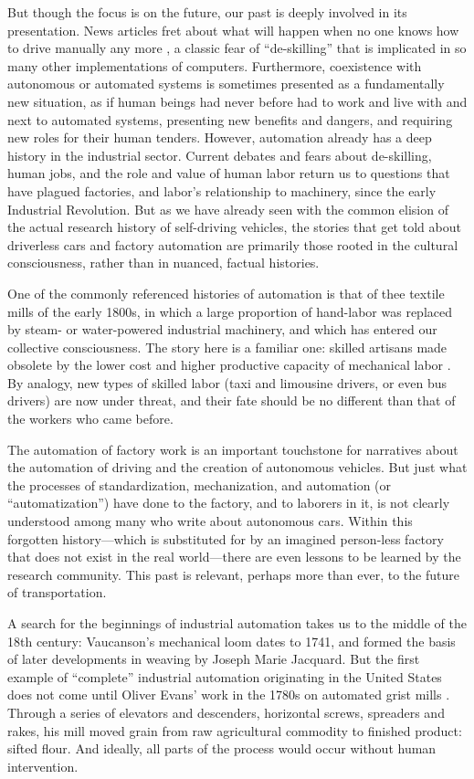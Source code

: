 But though the focus is on the future, our past is deeply involved
in its presentation. News articles fret
about what will happen when no one knows how to drive manually any
more \cite{pross}, a classic fear of ``de-skilling'' that is implicated in so many
other implementations of computers. Furthermore, coexistence with
autonomous or automated systems is sometimes presented as a fundamentally new
situation, as if human beings had never before had to work and live
with and next to automated systems, presenting new benefits and
dangers, and requiring new roles for their human tenders. However,
automation already has a deep 
history in the industrial sector. Current debates and fears about de-skilling, human jobs,
and the role and value of human labor return us to questions that have
plagued factories, and labor's relationship to machinery, since the
early Industrial Revolution. But as we have already seen with the common
elision of the actual research history of self-driving vehicles, the
stories that get told about driverless cars and factory automation are
primarily those rooted in the cultural consciousness, rather than in
nuanced, factual histories.

One of the commonly referenced histories of automation is that of thee
textile mills of the early 1800s, in which a large
proportion of hand-labor was replaced by steam- or
water-powered industrial machinery, and which has entered our collective
consciousness. The
story here is a familiar one: skilled artisans made obsolete by the
lower cost and higher productive capacity of mechanical labor \cite{pewPositive}. By
analogy, new types of skilled labor (taxi and limousine drivers, or
even bus drivers) are now under threat, and their fate should be no
different than that of the workers who came before.

The automation of factory work is an
important touchstone for narratives about the automation of driving
and the creation of autonomous vehicles. But just what the
processes of standardization, mechanization, and automation (or
``automatization'') have done to the factory, and to laborers in it, is
not clearly understood among many who write about autonomous cars. Within this
forgotten history---which is substituted for by an imagined person-less
factory that does not exist in the real world---there are even lessons to be
learned by the research community. This past is relevant, perhaps
more than ever, to the future of transportation.

A search for the beginnings of industrial automation takes us to the middle of
the 18th century: Vaucanson's mechanical loom dates to 1741, and formed the basis of
 later developments in weaving by Joseph Marie Jacquard.\cite[p. 9]{dieboldImpact} 
But the first example of ``complete'' industrial automation originating in the
United States does not come until Oliver Evans' work in the 1780s on
automated grist mills \cite[p. 5]{roesmithYankee}. Through a series of elevators and descenders,
horizontal screws, spreaders and rakes, his mill moved grain from raw
agricultural commodity to finished product: sifted flour. And ideally,
all parts of the process would occur without human intervention. 

